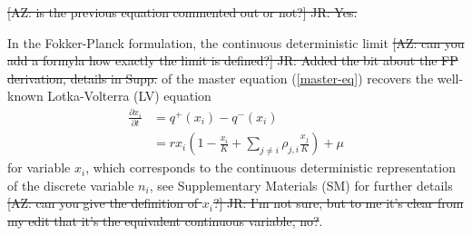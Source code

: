 \documentclass[9pt,twocolumn,twoside,lineno]{pnas-new}
\begin{document}
\iffalse
The full master of the Equation...  can be reduced to the one dimensional master equation for the marginal distribution $P(n)$ with effective birth-death rates (see SM for derivation)[AZ: is this an exact reduction, or there is an approximation involved?]

\begin{eqnarray}
q^+(n)&=&r^+ n +\mu,  \\
q^-(n)&=&r^- n + \frac{r}{K} n \left((1-\rho)n + \rho \langle J | n_i = n \rangle \right). \nonumber
\end{eqnarray}
\fi
\st{[AZ: is the previous equation commented out or not?] JR: Yes.}

In the Fokker-Planck formulation, the continuous deterministic limit \st{[AZ: can you add a formyla how exactly the limit is defined?] JR: Added the bit about the FP derivation, details in Supp.} of the master equation (\ref{master-eq}) recovers the well-known Lotka-Volterra (LV) equation
\begin{align}
    \frac{\partial x_i}{\partial t}&= q^+(x_i) - q^-(x_i)\nonumber\\
    &=r x_i \left( 1 - \frac{x_i}{K} + \sum_{j\neq i} \rho_{j,i}\frac{x_j}{K} \right) + \mu 
    \label{eq:LV}
\end{align}
for variable $x_i$, which corresponds to the continuous deterministic representation of the discrete variable $n_i$, see Supplementary Materials (SM) for further details \st{[AZ: can you give the definition of $x_i$?] JR: I'm not sure, but to me it's clear from my edit that it's the equivalent continuous variable, no?}. 
\end{document}

